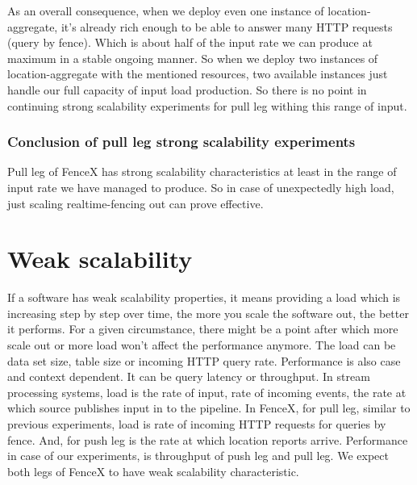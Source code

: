 \documentclass[a4]{report}
\begin{document}
    As an overall consequence, when we deploy even one instance of location-aggregate, it's already rich enough to be
    able to answer many HTTP requests (query by fence).
    Which is about half of the input rate we can produce at maximum in a stable ongoing manner.
    So when we deploy two instances of location-aggregate with the mentioned resources, two available instances just
    handle our full capacity of input load production.
    So there is no point in continuing strong scalability experiments for pull leg withing this range of input.

    \subsubsection{Conclusion of pull leg strong scalability experiments}
    Pull leg of FenceX has strong scalability characteristics at least in the range of input rate we have managed to
    produce.
    So in case of unexpectedly high load, just scaling realtime-fencing out can prove effective.


    \section{Weak scalability}
    If a software has weak scalability properties, it means providing a load which is increasing step by step over
    time, the more you scale the software out, the better it performs.
    For a given circumstance, there might be a point after which more scale out or more load won't affect
    the performance anymore.
    The load can be data set size, table size or incoming HTTP query rate.
    Performance is also case and context dependent.
    It can be query latency or throughput.
    In stream processing systems, load is the rate of input, rate of incoming events, the rate at
    which source publishes input in to the pipeline.
    In FenceX, for pull leg, similar to previous experiments, load is rate of incoming HTTP requests for queries by
    fence.
    And, for push leg is the rate at which location reports arrive.
    Performance in case of our experiments, is throughput of push leg and pull leg.
    We expect both legs of FenceX to have weak scalability characteristic.
\end{document}
